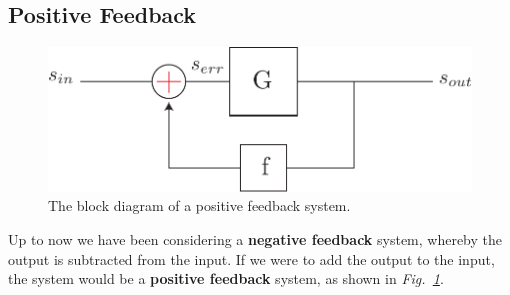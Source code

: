 \subsection{Positive Feedback}
\begin{figure}[tb]
\centering
\includegraphics[scale=.7]{fbblock_posfb}
\caption{The block diagram of a positive feedback system.}
\label{fig:fbblock_posfb}
\end{figure}
Up to now we have been considering a \textbf{negative feedback} system, whereby the output is subtracted from the input. If we were to add the output to the input, the system would be a \textbf{positive feedback} system, as shown in \emph{Fig.~\ref{fig:fbblock_posfb}}.

